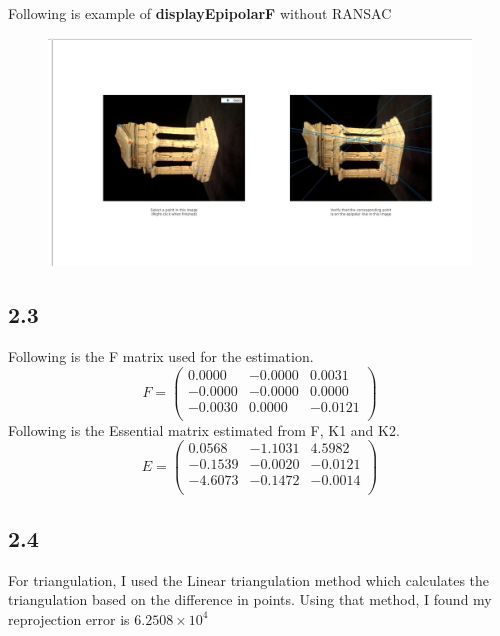 \documentclass{article}
\begin{document}
Following is example of \textbf{displayEpipolarF} without RANSAC
\begin{figure}[H]
    \centering
    \includegraphics[width=6.5in]{./figures/no_randsac}
\end{figure}

\subsection*{2.3}
Following is the F matrix used for the estimation.
\begin{equation*}
F = 
\begin{pmatrix}
    0.0000  & -0.0000  &  0.0031 \\
   -0.0000  & -0.0000  &  0.0000 \\
   -0.0030  &  0.0000  & -0.0121 \\
\end{pmatrix}
\end{equation*}
Following is the Essential matrix estimated from F, K1 and K2.
\begin{equation*}
E = 
\begin{pmatrix}
    0.0568   &-1.1031  & 4.5982\\
   -0.1539  & -0.0020  & -0.0121\\
   -4.6073  & -0.1472  & -0.0014\\
\end{pmatrix}
\end{equation*}
\subsection*{2.4}
For triangulation, I used the Linear triangulation method which calculates the triangulation based on the difference in points. Using that method, I found my reprojection error is $6.2508 \times 10^4$ 
\end{document}
